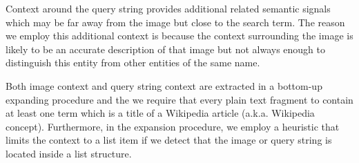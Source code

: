 Context around the query string  provides additional related 
semantic signals which may be far away from the image but close to 
the search term. The reason we employ this additional context is because 
the context surrounding the image is likely
to be an accurate description of that image but not always enough 
to distinguish this entity from other entities of the same name. 
%
%
%

Both image context and query string context are extracted in a bottom-up 
expanding procedure and the we require that
every plain text fragment to contain at least one term which is a title
of a Wikipedia article (a.k.a. Wikipedia concept).
Furthermore, in the expansion procedure, we employ a
heuristic that limits the context to a list item if we detect that
the image or query string is located inside a list structure.

